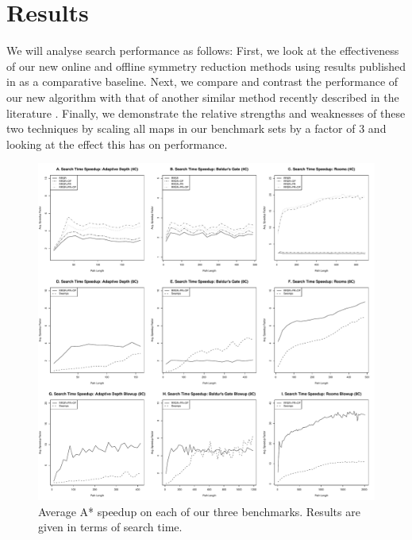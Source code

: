 \section{Results}
\label{sec-results}
%

We will analyse search performance as follows: 
First, we look at the effectiveness of our new online and offline symmetry
reduction methods using results published in \cite{harabor10} as a 
comparative baseline.
Next, we compare and contrast the performance of our new algorithm with that
of another similar method recently described in the literature \cite{pochter10}.
Finally, we demonstrate the relative strengths and weaknesses of these two
techniques by scaling all maps in our benchmark sets by a factor of 3 and looking
at the effect this has on performance.


\begin{figure}[t]
       \begin{center}
                       \includegraphics[width=1.95\columnwidth, trim = 10mm 10mm 10mm 0mm]{diagrams/speedup.pdf}
       \end{center}
       \caption{Average A* speedup on each of our three benchmarks. 
		Results are given in terms of search time.}
\label{fig-speedup}
\end{figure}


